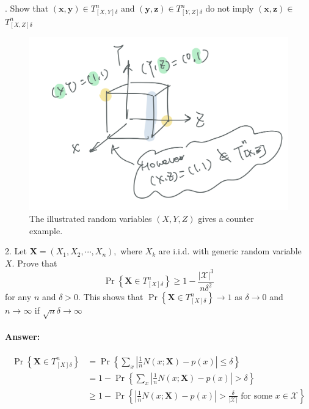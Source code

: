 \documentclass[8pt]{article}
\begin{document}
. Show that $(\mathbf{x}, \mathbf{y}) \in T_{[X, Y] \delta}^{n}$ and $(\mathbf{y}, \mathbf{z}) \in T_{[Y, Z] \delta}^{n}$ do not imply $(\mathbf{x}, \mathbf{z}) \in$
$T_{[X, Z] \delta}^{n}$
\begin{figure}[!h]
	\centering
	\includegraphics[width=0.3\linewidth]{imgs/hw6_1.png}
	\caption{The illustrated random variables $(X, Y, Z)$ gives a counter example.}
\end{figure}

\vspace{10pt}
2. Let $\mathbf{X}=\left(X_{1}, X_{2}, \cdots, X_{n}\right),$ where $X_{k}$ are i.i.d. with generic random variable $X .$ Prove that
$$
\operatorname{Pr}\left\{\mathbf{X} \in T_{[X] \delta}^{n}\right\} \geq 1-\frac{|\mathcal{X}|^{3}}{n \delta^{2}}
$$
for any $n$ and $\delta>0 .$ This shows that $\operatorname{Pr}\left\{\mathbf{X} \in T_{[X] \delta}^{n}\right\} \rightarrow 1$ as $\delta \rightarrow 0$ and $n \rightarrow \infty$ if $\sqrt{n} \delta \rightarrow \infty$
\paragraph{Answer:}
$$
\begin{aligned}
	\operatorname{Pr}\left\{\mathbf{X} \in T_{[X] \delta}^{n}\right\} 
	&=\operatorname{Pr}\left\{\sum_{x}\left|\frac{1}{n} N(x ; \mathbf{X})-p(x)\right| \leq \delta\right\} \\
	&=1-\operatorname{Pr}\left\{\sum_{x}\left|\frac{1}{n} N(x ; \mathbf{X})-p(x)\right|>\delta\right\} \\
	&\geq 1-\operatorname{Pr}\left\{\left|\frac{1}{n} N(x ; \mathbf{X})-p(x)\right|>\frac{\delta}{|\mathcal{X}|} \text { for some } x \in \mathcal{X}\right\} \\
\end{aligned}
$$
\end{document}
